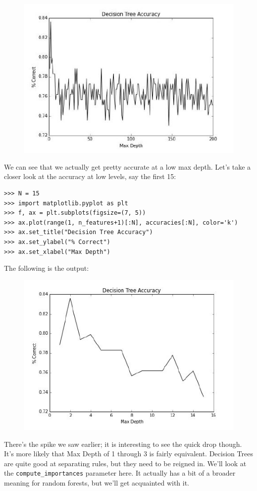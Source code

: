 \documentclass[SKL-MASTER.tex]{subfiles}
\begin{document}
\begin{figure}[h!]
\centering
\includegraphics[width=0.7\linewidth]{images/SKL33-DT2}
\end{figure}


We can see that we actually get pretty accurate at a low max depth. Let's take a closer look at
the accuracy at low levels, say the first 15:
\begin{framed}
\begin{verbatim}
>>> N = 15
>>> import matplotlib.pyplot as plt
>>> f, ax = plt.subplots(figsize=(7, 5))
>>> ax.plot(range(1, n_features+1)[:N], accuracies[:N], color='k')
>>> ax.set_title("Decision Tree Accuracy")
>>> ax.set_ylabel("% Correct")
>>> ax.set_xlabel("Max Depth")
\end{verbatim}
\end{framed}
The following is the output:

\begin{figure}
\centering
\includegraphics[width=0.7\linewidth]{images/SKL33-DT3}
\caption{}
\label{fig:SKL33-DT3}
\end{figure}

There's the spike we saw earlier; it is interesting to see the quick drop though. It's more
likely that Max Depth of 1 through 3 is fairly equivalent. Decision Trees are quite good at
separating rules, but they need to be reigned in.
We'll look at the \texttt{compute\_importances} parameter here. It actually has a bit of a broader
meaning for random forests, but we'll get acquainted with it.
\end{document}
